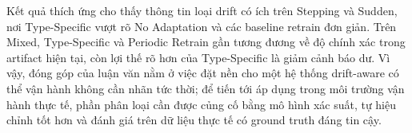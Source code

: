 Kết quả thích ứng cho thấy thông tin loại drift có ích trên Stepping và Sudden, nơi Type-Specific vượt rõ No Adaptation và các baseline retrain đơn giản. Trên Mixed, Type-Specific và Periodic Retrain gần tương đương về độ chính xác trong artifact hiện tại, còn lợi thế rõ hơn của Type-Specific là giảm cảnh báo dư. Vì vậy, đóng góp của luận văn nằm ở việc đặt nền cho một hệ thống drift-aware có thể vận hành không cần nhãn tức thời; để tiến tới áp dụng trong môi trường vận hành thực tế, phần phân loại cần được củng cố bằng mô hình xác suất, tự hiệu chỉnh tốt hơn và đánh giá trên dữ liệu thực tế có ground truth đáng tin cậy.

